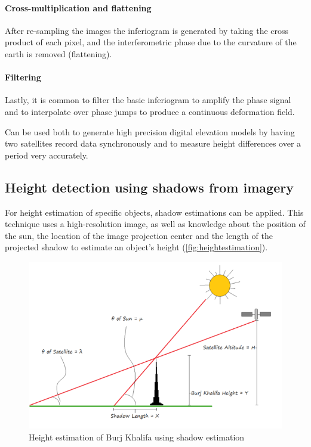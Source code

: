 \paragraph{Cross-multiplication and flattening}
After re-sampling the images the inferiogram is generated by taking the cross product of each pixel, and the interferometric phase due to the curvature of the earth is removed (flattening).

\paragraph{Filtering}
Lastly, it is common to filter the basic inferiogram to amplify the phase signal and to interpolate over phase jumps to produce a continuous deformation field.

Can be used both to generate high precision digital elevation models by having two satellites record data synchronously and to measure height differences over a period very accurately.

\subsection{Height detection using shadows from imagery}
For height estimation of specific objects, shadow estimations can be applied. This technique uses a high-resolution image, as well as knowledge about the position of the sun, the location of the image projection center and the length of the projected shadow to estimate an object's height (\autoref{fig:heightestimation}).

\begin{figure}[!h]
	\centering
	\includegraphics[scale=0.5]{fig/height_estimation.png}
	\caption{Height estimation of Burj Khalifa using shadow estimation \citep{GISLounge2014}}
	\label{fig:heightestimation}
\end{figure}

